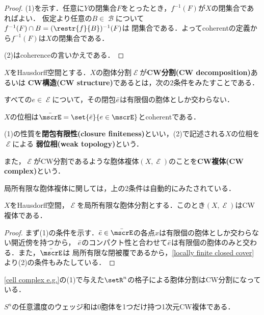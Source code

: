 \documentclass[uplatex]{jsarticle}
\newcommand{\setinverse}[2]{#1 ^{-1}(#2)}
\begin{document}
\begin{proof}
  (1)を示す．任意に$Y$の閉集合$F$をとったとき，$\setinverse{f}{F}$が$X$の閉集合であればよい．
  仮定より任意の$B\in \mscrB$について$\setinverse{f}{F}\cap B=\setinverse{(\restr{f}{B})}{F}$は
  閉集合である．よってcoherentの定義から$\setinverse{f}{F}$は$X$の閉集合である．

  (2)はcoherenceの言いかえである．
\end{proof}

\begin{definition}
  $X$をHausdorff空間とする．$X$の胞体分割$\mscrE$が\textbf{CW分割(CW decomposition)}あるいは
  \textbf{CW構造(CW structure)}であるとは，次の2条件をみたすことである．
  \begin{enumarabicp}
    \item
    すべての$e\in \mscrE$について，その閉包$\Bar{e}$は有限個の胞体としか交わらない．
    \item
    $X$の位相は$\Bar{\mscrE}=\set{\Bar{e}}{e\in \mscrE}$とcoherentである．
  \end{enumarabicp}
  (1)の性質を\textbf{閉包有限性(closure finiteness)}といい，(2)で記述される$X$の位相を$\mscrE$による
  \textbf{弱位相(weak topology)}という．

  また，$\mscrE$がCW分割であるような胞体複体$(X,\mscrE)$のことを\textbf{CW複体(CW complex)}という．
\end{definition}

局所有限な胞体複体に関しては，上の2条件は自動的にみたされている．

\begin{proposition}
  $X$をHausdorff空間，$\mscrE$を局所有限な胞体分割とする．このとき$(X,\mscrE)$はCW複体である．
\end{proposition}

\begin{proof}
  まず(1)の条件を示す．$\Bar{e}\in \Bar{\mscrE}$の各点$x$は有限個の胞体としか交わらない開近傍を持つから，
  $\Bar{e}$のコンパクト性と合わせて$\Bar{e}$は有限個の胞体のみと交わる．また，$\Bar{\mscrE}$は
  局所有限な閉被覆であるから，\cref{locally finite closed cover}より(2)の条件もみたしている．
\end{proof}

\begin{example}
  \begin{enumarabicp}
    \item
    \cref{cell complex e.g.}の(1)で与えた$\setR^n$の格子による胞体分割はCW分割になっている．
    \item
    $S^n$の任意濃度のウェッジ和は0胞体を1つだけ持つ1次元CW複体である．
  \end{enumarabicp}
\end{example}
\end{document}
